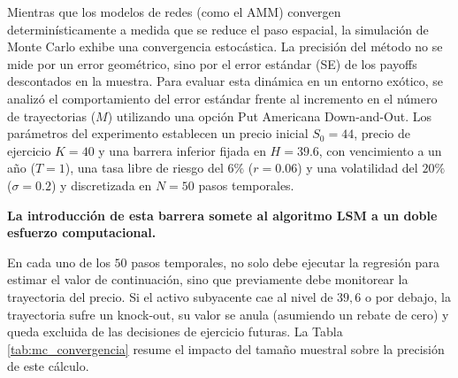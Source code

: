 Mientras que los modelos de redes (como el AMM) convergen determinísticamente a medida que se reduce el paso espacial, la simulación de Monte Carlo exhibe una convergencia estocástica. La precisión del método no se mide por un error geométrico, sino por el error estándar (SE) de los payoffs descontados en la muestra.
Para evaluar esta dinámica en un entorno exótico, se analizó el comportamiento del error estándar frente al incremento en el número de trayectorias ($M$) utilizando una opción Put Americana Down-and-Out. Los parámetros del experimento establecen un precio inicial $S_0=44$, precio de ejercicio $K=40$ y una barrera inferior fijada en $H=39.6$, con vencimiento a un año ($T=1$), una tasa libre de riesgo del $6\%$ ($r=0.06$) y una volatilidad del $20\%$ ($\sigma=0.2$) y discretizada en $N=50$ pasos temporales.

\textbf{La introducción de esta barrera somete al algoritmo LSM a un doble esfuerzo computacional.}

En cada uno de los $50$ pasos temporales, no solo debe ejecutar la regresión para estimar el valor de continuación, sino que previamente debe monitorear la trayectoria del precio. Si el activo subyacente cae al nivel de $39,6$ o por debajo, la trayectoria sufre un knock-out, su valor se anula (asumiendo un rebate de cero) y queda excluida de las decisiones de ejercicio futuras. La Tabla \ref{tab:mc_convergencia} resume el impacto del tamaño muestral sobre la precisión de este cálculo.

\begin{table}[H]
  \centering
  \caption{Convergencia del Error Estándar y Tiempos de Ejecución en Monte Carlo LSM. Opción Put Americana: $S_0=44$, $K=40$, $T=1$, $r=0.06$, $\sigma=0.20$.}
  \label{tab:mc_convergencia}
\end{table}

